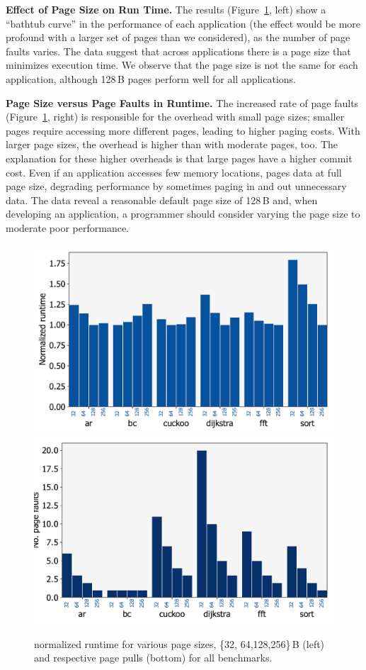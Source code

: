 \textbf{Effect of Page Size on Run Time.} The results (Figure~\ref{fig:page_size}, left) show a ``bathtub curve'' in the performance of each application (the effect would be more profound with a larger set of pages than we considered), as the number of page faults varies. The data suggest that across applications there is a page size that minimizes execution time. We observe that the page size is not the same for each application, although 128\,B pages perform well for all applications. 

\textbf{Page Size versus Page Faults in \sys Runtime.} The increased rate of page faults (Figure~\ref{fig:page_size}, right) is responsible for the overhead with small page sizes; smaller pages require accessing more different pages, leading to higher paging costs. With larger page sizes, the overhead is higher than with moderate pages, too. The explanation for these higher overheads is that large pages have a higher commit cost. Even if an application accesses few memory locations, \sys pages data at full page size, degrading performance by sometimes paging in and out unnecessary data. The data reveal a reasonable default page size of 128\,B and, when developing an application, a programmer should consider varying the page size to moderate poor performance.

\begin{figure}
	\centering
	\includegraphics[width=0.49\columnwidth]{figures/page_exec-time}
	\includegraphics[width=0.49\columnwidth]{figures/pagePulls}
	\caption{\sys normalized runtime for various page sizes, \{32, 64,128,256\}\,B (left) and respective page pulls (bottom) for all benchmarks.}
	\label{fig:page_size}
\end{figure}

